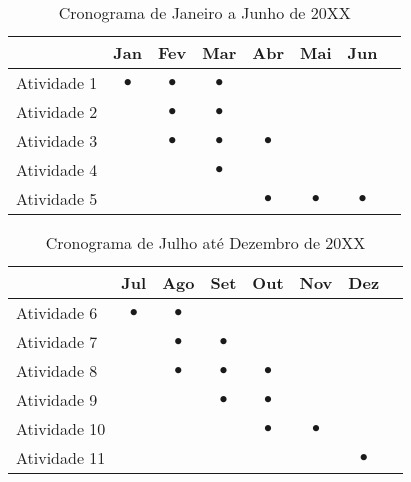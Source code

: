 \documentclass[font=plain]{abnt}
\begin{document}
\begin{table}[ht]
    \centering
    \begin{tabular}{ p{7.8cm} c c c c c c c }
        \toprule
         & Jan       & Fev       & Mar       & Abr       & Mai       & Jun       & \\
        \midrule
        Atividade 1
         & $\bullet$ & $\bullet$ & $\bullet$ &           &           &           & \\
        \midrule
        Atividade 2
         &           & $\bullet$ & $\bullet$ &           &           &           & \\
        \midrule
        Atividade 3
         &           & $\bullet$ & $\bullet$ & $\bullet$ &           &           & \\
        \midrule
        Atividade 4
         &           &           & $\bullet$ &           &           &           & \\
        \midrule
        Atividade 5
         &           &           &           & $\bullet$ & $\bullet$ & $\bullet$ & \\
        \bottomrule
    \end{tabular}
    \caption{Cronograma de Janeiro a Junho de 20XX}
    \label{tab:cronograma-1-2}
\end{table}

\begin{table}[hb]
    \centering
    \begin{tabular}{ p{7.8cm} c c c c c c c }
        \toprule
         & Jul       & Ago       & Set       & Out       & Nov       & Dez       & \\
        \midrule
        Atividade 6
         & $\bullet$ & $\bullet$ &           &           &           &           & \\
        \midrule
        Atividade 7
         &           & $\bullet$ & $\bullet$ &           &           &           & \\
        \midrule
        Atividade 8
         &           & $\bullet$ & $\bullet$ & $\bullet$ &           &           & \\
        \midrule
        Atividade 9
         &           &           & $\bullet$ & $\bullet$ &           &           & \\
        \midrule
        Atividade 10
         &           &           &           & $\bullet$ & $\bullet$ &           & \\
        \midrule
        Atividade 11
         &           &           &           &           &           & $\bullet$ & \\
        \bottomrule
    \end{tabular}
    \caption{Cronograma de Julho até Dezembro de 20XX}
    \label{tab:cronograma-2-2}
\end{table}
\end{document}
